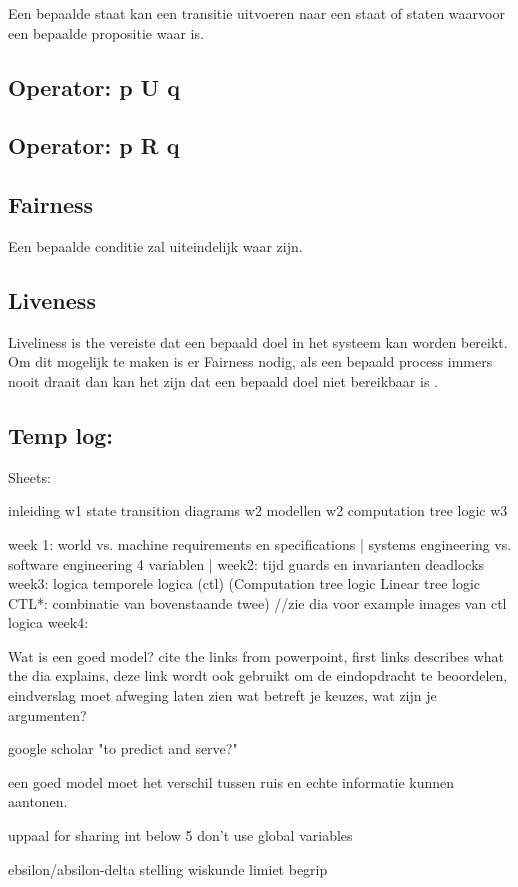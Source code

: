 \documentclass{article}
\begin{document}
Een bepaalde staat kan een transitie uitvoeren naar een staat of staten waarvoor een bepaalde propositie waar is.

\subsection{Operator: p U q}

\subsection{Operator: p R q}

\subsection{Fairness}

Een bepaalde conditie zal uiteindelijk waar zijn.

\subsection{Liveness}

Liveliness is the vereiste dat een bepaald doel in het systeem kan worden bereikt. Om dit mogelijk te maken is er Fairness nodig, als een bepaald process immers nooit draait dan kan het zijn dat een bepaald doel niet bereikbaar is \cite{fairnessandliveness}.

\newpage
\subsection{Temp log:}
Sheets:

inleiding w1
state transition diagrams w2
modellen w2
computation tree logic w3


week 1: 
world vs. machine
requirements en specifications |
systems engineering vs. software engineering
4 variablen |
week2:
tijd
guards en invarianten
deadlocks
week3:
logica
temporele logica (ctl)
(Computation tree logic
Linear tree logic
CTL*: combinatie van bovenstaande twee)
//zie dia voor example images van ctl logica
week4:




Wat is een goed model? cite the links from powerpoint, first links describes what the dia explains, deze link wordt ook gebruikt om de eindopdracht te beoordelen, eindverslag moet afweging laten zien wat betreft je keuzes, wat zijn je argumenten?

google scholar "to predict and serve?"

een goed model moet het verschil tussen ruis en echte informatie kunnen aantonen.

uppaal for sharing int below 5 don't use global variables

ebsilon/absilon-delta stelling wiskunde limiet begrip
\newpage


\end{document}
